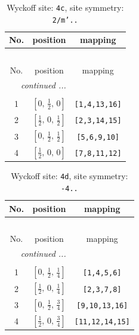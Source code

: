 \documentclass[fleqn,8pt]{jsarticle}
\begin{document}
\renewcommand{\arraystretch}{1.2}
\begin{longtable}{ccc}
\caption{Wyckoff site: {\tt 4c}, site symmetry: {\tt 2/m'..}}
 \\
 \hline \hline
No. & position & mapping \\ \hline \endfirsthead

\multicolumn{2}{l}{\tablename\ \thetable{}} \\
 \hline \hline
No. & position & mapping \\ \hline \endhead

 \hline \hline
\multicolumn{2}{r}{\footnotesize\it continued ...} \\ \endfoot

 \hline \hline
\multicolumn{2}{r}{} \\ \endlastfoot

1 & $\left[ 0,\, \frac{1}{2},\, 0 \right]$ & {\tt [1,4,13,16]} \\ \hline
2 & $\left[ \frac{1}{2},\, 0,\, \frac{1}{2} \right]$ & {\tt [2,3,14,15]} \\ \hline
3 & $\left[ 0,\, \frac{1}{2},\, \frac{1}{2} \right]$ & {\tt [5,6,9,10]} \\ \hline
4 & $\left[ \frac{1}{2},\, 0,\, 0 \right]$ & {\tt [7,8,11,12]} \\
\end{longtable}
\renewcommand{\arraystretch}{1.2}
\begin{longtable}{ccc}
\caption{Wyckoff site: {\tt 4d}, site symmetry: {\tt -4..}}
 \\
 \hline \hline
No. & position & mapping \\ \hline \endfirsthead

\multicolumn{2}{l}{\tablename\ \thetable{}} \\
 \hline \hline
No. & position & mapping \\ \hline \endhead

 \hline \hline
\multicolumn{2}{r}{\footnotesize\it continued ...} \\ \endfoot

 \hline \hline
\multicolumn{2}{r}{} \\ \endlastfoot

1 & $\left[ 0,\, \frac{1}{2},\, \frac{1}{4} \right]$ & {\tt [1,4,5,6]} \\ \hline
2 & $\left[ \frac{1}{2},\, 0,\, \frac{1}{4} \right]$ & {\tt [2,3,7,8]} \\ \hline
3 & $\left[ 0,\, \frac{1}{2},\, \frac{3}{4} \right]$ & {\tt [9,10,13,16]} \\ \hline
4 & $\left[ \frac{1}{2},\, 0,\, \frac{3}{4} \right]$ & {\tt [11,12,14,15]} \\
\end{longtable}
\end{document}
